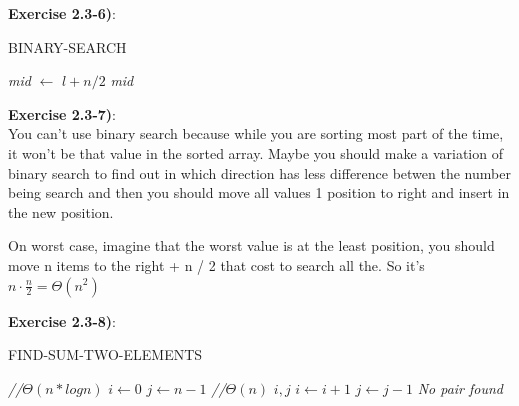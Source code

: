 \documentclass{article}
\newcounter{exercise}[section]   %
\begin{document}
\newpage
{}
\textbf{Exercise 2.3-6)}:\\
\begin{algorithm}
    \caption{BINARY-SEARCH}\label{BinarySearchID}
    \begin{algorithmic}[1]
                \Return
            \EndIf
            \State \textit{mid} \(\gets\) \(l + n / 2\)
                \State {}
                \State {}
            \Else 
                \quad \Return \textit{mid}
            \EndIf
        \EndFunction
    \end{algorithmic}
\end{algorithm}

\textbf{Exercise 2.3-7)}:\\
You can't use binary search because while you are sorting most part of the time, it won't
be that value in the sorted array. Maybe you should make a variation of binary search to 
find out in which direction has less difference betwen the number being search and then
you should move all values 1 position to right and insert in the new position.

On worst case, imagine that the worst value is at the least position, you should move
n items to the right + n / 2 that cost to search all the. So it's  \(n \cdot \frac{n}{2} = \Theta(n^2)\)

\textbf{Exercise 2.3-8)}:
\begin{algorithm}
    \caption{FIND-SUM-TWO-ELEMENTS}\label{FindSumTwoElementsID}
    \begin{algorithmic}[1]
            \State {} \quad \textit{//\(\Theta(n * log n)\)}
            \State \( i \gets 0 \)
            \State \( j \gets n - 1 \)
             \quad \textit{//\(\Theta(n)\)}
                    \State \Return \( i, j \)
                    \State \( i \gets i + 1 \)
                \Else
                    \State \( j \gets j - 1 \)
                \EndIf
            \EndWhile
            \State \Return \textit{No pair found}
        \EndFunction
    \end{algorithmic}
\end{algorithm}
\end{document}
